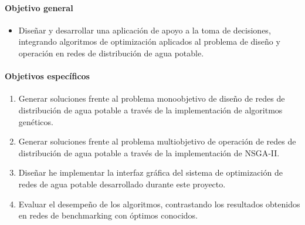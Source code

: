 \documentclass[11pt,letterpaper]{article}
\begin{document}
\paragraph{Objetivo general}

\begin{itemize}
\item Diseñar y desarrollar una aplicación de apoyo a la toma de decisiones, integrando algoritmos de optimización aplicados al problema de diseño y operación en redes de distribución de agua potable.
\end{itemize}

\paragraph{Objetivos específicos}%
\begin{enumerate}
\item Generar soluciones frente al problema monoobjetivo de diseño de redes de distribución de agua potable a través de la implementación de algoritmos genéticos.
\item Generar soluciones frente al problema multiobjetivo de operación de redes de distribución de agua potable a través de la implementación de NSGA-II.
\item Diseñar he implementar la interfaz gráfica del sistema de optimización de redes de agua potable desarrollado durante este proyecto.
\item Evaluar el desempeño de los algoritmos, contrastando los resultados obtenidos en redes de benchmarking con óptimos conocidos.

\end{enumerate}
\end{document}
